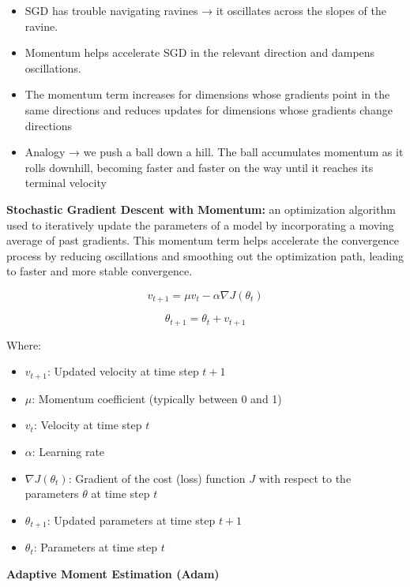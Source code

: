 \begin{itemize}
    \item SGD has trouble navigating ravines → it oscillates across the slopes of the ravine.
    \item Momentum helps accelerate SGD in the relevant direction and dampens oscillations.
    \item The momentum term increases for dimensions whose gradients point in the same directions and reduces updates for dimensions whose gradients change directions
    \item Analogy → we push a ball down a hill. The ball accumulates momentum as it rolls downhill, becoming faster and faster on the way until it reaches its terminal velocity

\end{itemize}

\begin{definition}
    \textbf{Stochastic Gradient Descent with Momentum:} an optimization algorithm used to iteratively update the parameters of a model by incorporating a moving average of past gradients. This momentum term helps accelerate the convergence process by reducing oscillations and smoothing out the optimization path, leading to faster and more stable convergence.
\end{definition}


\[v_{t+1} = \mu v_{t} - \alpha \nabla J(\theta_t)\]


\[\theta_{t+1} = \theta_t + v_{t+1}\]



Where:
\begin{itemize}
  \item $v_{t+1}$: Updated velocity at time step $t+1$
  \item $\mu$: Momentum coefficient (typically between 0 and 1)
  \item $v_{t}$: Velocity at time step $t$
  \item $\alpha$: Learning rate
  \item $\nabla J(\theta_t)$: Gradient of the cost (loss) function $J$ with respect to the parameters $\theta$ at time step $t$
  \item $\theta_{t+1}$: Updated parameters at time step $t+1$
  \item $\theta_t$: Parameters at time step $t$
\end{itemize}


\noindent\textbf{Adaptive Moment Estimation (Adam)}

